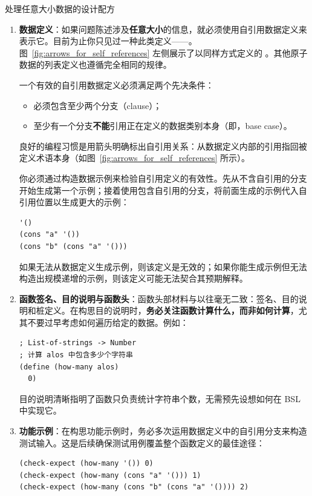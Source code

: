 \begin{recipebox}{处理任意大小数据的设计配方}
\begin{enumerate}
  \item \textbf{数据定义}：如果问题陈述涉及\textbf{任意大小}的信息，就必须使用自引用数据定义来表示它。目前为止你只见过一种此类定义——。图~\ref{fig:arrows_for_self_references} 左侧展示了以同样方式定义的 。其他原子数据的列表定义也遵循完全相同的规律。
  
  一个有效的自引用数据定义必须满足两个先决条件：
  \begin{itemize}
    \item 必须包含至少两个分支（clause）；
    \item 至少有一个分支\textbf{不能}引用正在定义的数据类别本身（即，base case）。
  \end{itemize}
  良好的编程习惯是用箭头明确标出自引用关系：从数据定义内部的引用指回被定义术语本身（如图~\ref{fig:arrows_for_self_references} 所示）。

  你必须通过构造数据示例来检验自引用定义的有效性。先从不含自引用的分支开始生成第一个示例；接着使用包含自引用的分支，将前面生成的示例代入自引用位置以生成更大的示例：
\begin{lstlisting}[language=BSL]
'()
(cons "a" '())
(cons "b" (cons "a" '()))
\end{lstlisting}
  如果无法从数据定义生成示例，则该定义是无效的；如果你能生成示例但无法构造出规模递增的示例，则该定义可能无法契合其预期解释。

  \item \textbf{函数签名、目的说明与函数头}：函数头部材料与以往毫无二致：签名、目的说明和桩定义。在构思目的说明时，\textbf{务必关注函数计算什么，而非如何计算}，尤其不要过早考虑如何遍历给定的数据。例如：
\begin{lstlisting}[language=BSL]
; List-of-strings -> Number
; 计算 alos 中包含多少个字符串
(define (how-many alos)
  0)
\end{lstlisting}
  目的说明清晰指明了函数只负责统计字符串个数，无需预先设想如何在 BSL 中实现它。

  \item \textbf{功能示例}：在构思功能示例时，务必多次运用数据定义中的自引用分支来构造测试输入。这是后续确保测试用例覆盖整个函数定义的最佳途径：
\begin{lstlisting}[language=BSL]
(check-expect (how-many '()) 0)
(check-expect (how-many (cons "a" '())) 1)
(check-expect (how-many (cons "b" (cons "a" '()))) 2)
\end{lstlisting}


\end{enumerate}
\end{recipebox}

